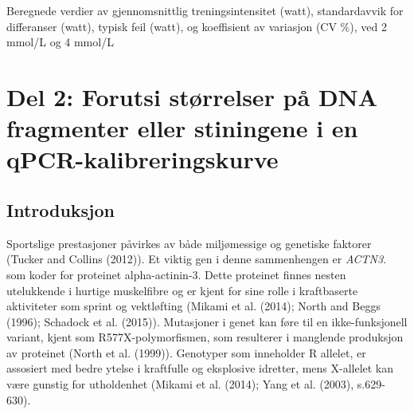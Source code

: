 \documentclass[
  letterpaper,
  DIV=11,
  numbers=noendperiod]{scrreprt}
\begin{document}
\begin{table}

\caption{\label{tbl-reliabilitet}Beregnede verdier av gjennomsnittlig
treningsintensitet (watt), standardavvik for differanser (watt), typisk
feil (watt), og koeffisient av variasjon (CV \%), ved 2 mmol/L og 4
mmol/L}


\end{table}%

\section{Del 2: Forutsi størrelser på DNA fragmenter eller stiningene i
en
qPCR-kalibreringskurve}\label{del-2-forutsi-stuxf8rrelser-puxe5-dna-fragmenter-eller-stiningene-i-en-qpcr-kalibreringskurve}

\subsection{Introduksjon}\label{introduksjon-2}

Sportslige prestasjoner påvirkes av både miljømessige og genetiske
faktorer (Tucker and Collins (2012)). Et viktig gen i denne sammenhengen
er \emph{ACTN3}. som koder for proteinet alpha-actinin-3. Dette
proteinet finnes nesten utelukkende i hurtige muskelfibre og er kjent
for sine rolle i kraftbaserte aktiviteter som sprint og vektløfting
(Mikami et al. (2014); North and Beggs (1996); Schadock et al. (2015)).
Mutasjoner i genet kan føre til en ikke-funksjonell variant, kjent som
R577X-polymorfismen, som resulterer i manglende produksjon av proteinet
(North et al. (1999)). Genotyper som inneholder R allelet, er assosiert
med bedre ytelse i kraftfulle og eksplosive idretter, mens X-allelet kan
være gunstig for utholdenhet (Mikami et al. (2014); Yang et al. (2003),
s.629-630).
\end{document}
